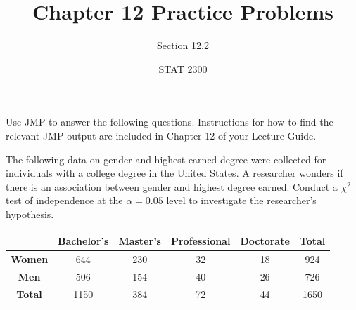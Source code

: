 \documentclass[noanswers]{exam}
\title{Chapter 12 Practice Problems}
\author{Section 12.2}
\date{STAT 2300}
\begin{document}
%

\noindent Use JMP to answer the following questions. Instructions for how to find the relevant JMP output are included in Chapter 12 of your Lecture Guide.

\begin{questions} 

\question The following data on gender and highest earned degree were collected for individuals with a college degree in the United States. A researcher wonders if there is an association between gender and highest degree earned. Conduct a $\chi^2$ test of independence at the $\alpha=0.05$ level to investigate the researcher's hypothesis.

\begin{center}
\begin{tabular}{|c|c|c|c|c||c|}
\hline
 & \textbf{Bachelor's} & \textbf{Master's} & \textbf{Professional} & \textbf{Doctorate} & \textbf{Total} \\
 \hline
 \textbf{Women} & 644 & 230 & 32 & 18 & 924\\
 \hline
 \textbf{Men} & 506 & 154 & 40 & 26 & 726 \\
 \hline
 \hline
 \textbf{Total} & 1150 & 384 & 72 & 44 & 1650 \\
 \hline
\end{tabular}
\end{center}

\vspace{2mm}

\end{questions}
\end{document}
